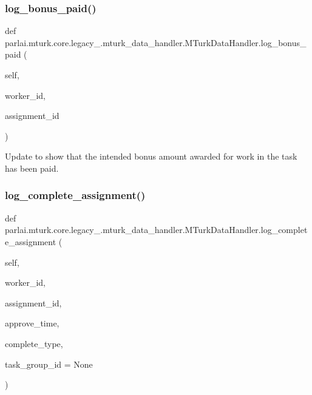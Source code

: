 \subsubsection{\texorpdfstring{log\+\_\+bonus\+\_\+paid()}{log\_bonus\_paid()}}
{\footnotesize\ttfamily def parlai.\+mturk.\+core.\+legacy\+\_.\+mturk\+\_\+data\+\_\+handler.\+M\+Turk\+Data\+Handler.\+log\+\_\+bonus\+\_\+paid (\begin{DoxyParamCaption}\item[{}]{self,  }\item[{}]{worker\+\_\+id,  }\item[{}]{assignment\+\_\+id }\end{DoxyParamCaption})}

\begin{DoxyVerb}Update to show that the intended bonus amount awarded for work in the task has
been paid.
\end{DoxyVerb}
 \mbox{\label{classparlai_1_1mturk_1_1core_1_1legacy__2018_1_1mturk__data__handler_1_1MTurkDataHandler_af086a3896a105801c66195efc8f95c03}} 
\subsubsection{\texorpdfstring{log\+\_\+complete\+\_\+assignment()}{log\_complete\_assignment()}}
{\footnotesize\ttfamily def parlai.\+mturk.\+core.\+legacy\+\_.\+mturk\+\_\+data\+\_\+handler.\+M\+Turk\+Data\+Handler.\+log\+\_\+complete\+\_\+assignment (\begin{DoxyParamCaption}\item[{}]{self,  }\item[{}]{worker\+\_\+id,  }\item[{}]{assignment\+\_\+id,  }\item[{}]{approve\+\_\+time,  }\item[{}]{complete\+\_\+type,  }\item[{}]{task\+\_\+group\+\_\+id = {\ttfamily None} }\end{DoxyParamCaption})}

